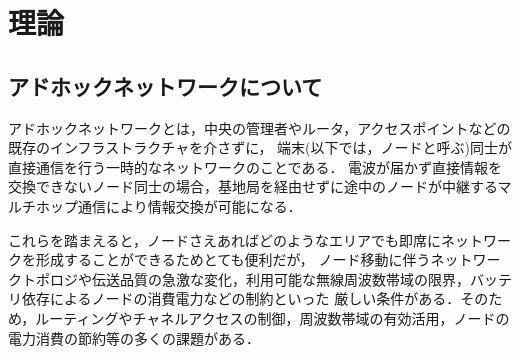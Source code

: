 \documentclass[a4paper, 11pt]{ltjsarticle}
\begin{document}

\clearpage
\section{理論}
\subsection{アドホックネットワークについて} \label{about_ad-hoc}
アドホックネットワークとは，中央の管理者やルータ，アクセスポイントなどの既存のインフラストラクチャを介さずに，
端末(以下では，ノードと呼ぶ)同士が直接通信を行う一時的なネットワークのことである．
電波が届かず直接情報を交換できないノード同士の場合，基地局を経由せずに途中のノードが中継するマルチホップ通信により情報交換が可能になる．

これらを踏まえると，ノードさえあればどのようなエリアでも即席にネットワークを形成することができるためとても便利だが，
ノード移動に伴うネットワークトポロジや伝送品質の急激な変化，利用可能な無線周波数帯域の限界，バッテリ依存によるノードの消費電力などの制約といった
厳しい条件がある．そのため，ルーティングやチャネルアクセスの制御，周波数帯域の有効活用，ノードの電力消費の節約等の多くの課題がある\cite{間瀬憲一2001アドホックネットワーク}．
\end{document}
